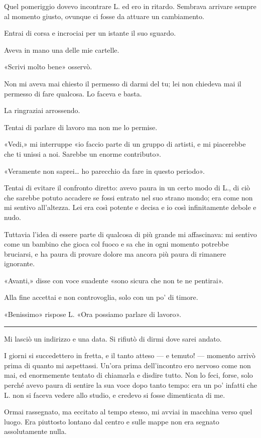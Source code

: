 \documentclass[a4paper,10pt]{memoir}
\begin{document}
Quel pomeriggio dovevo incontrare L. ed ero in ritardo. Sembrava arrivare sempre al momento giusto, ovunque ci fosse da
attuare un cambiamento.

Entrai di corsa e incrociai per un istante il suo sguardo.

Aveva in mano una delle mie cartelle.

«Scrivi molto bene» osservò.

Non mi aveva mai chiesto il permesso di darmi del tu; lei non chiedeva mai il permesso di fare qualcosa. Lo faceva e
basta.

La ringraziai arrossendo.

Tentai di parlare di lavoro ma non me lo permise.

«Vedi,» mi interruppe «io faccio parte di un gruppo di artisti, e mi piacerebbe che ti unissi a noi. Sarebbe un enorme
contributo».

«Veramente non saprei\dots{} ho parecchio da fare in questo periodo».

Tentai di evitare il confronto diretto: avevo paura in un certo modo di L., di ciò che sarebbe potuto accadere se fossi
entrato nel suo strano mondo; era come non mi sentivo all'altezza. Lei era così potente e decisa e io così infinitamente
debole e nudo.

Tuttavia l'idea di essere parte di qualcosa di più grande mi affascinava: mi sentivo come un bambino che gioca col fuoco
e sa che in ogni momento potrebbe bruciarsi, e ha paura di provare dolore ma ancora più paura di rimanere ignorante.

«Avanti,» disse con voce suadente «sono sicura che non te ne pentirai».

Alla fine accettai e non controvoglia, solo con un po' di timore.

«Benissimo» rispose L. «Ora possiamo parlare di lavoro».

\plainbreak{1}

Mi lasciò un indirizzo e una data. Si rifiutò di dirmi dove sarei andato.

I giorni si succedettero in fretta, e il tanto atteso --- e temuto! --- momento arrivò prima di quanto mi aspettassi.
Un'ora prima dell'incontro ero nervoso come non mai, ed enormemente tentato di chiamarla e disdire tutto. Non lo feci,
forse, solo perché avevo paura di sentire la sua voce dopo tanto tempo: era un po' infatti che L. non si faceva vedere
allo studio, e credevo si fosse dimenticata di me.

Ormai rassegnato, ma eccitato al tempo stesso, mi avviai in macchina verso quel luogo. Era piuttosto lontano dal centro
e sulle mappe non era segnato assolutamente nulla.
\end{document}
